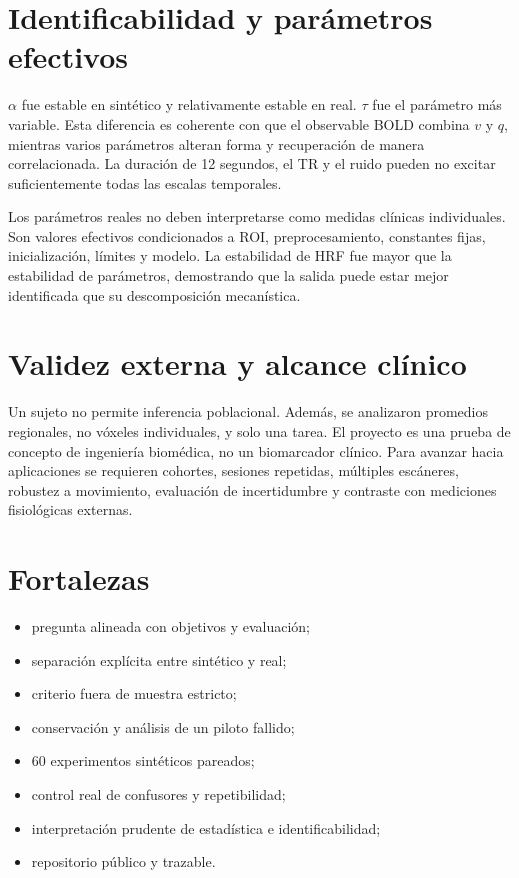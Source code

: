 \section{Identificabilidad y parámetros efectivos}
$\alpha$ fue estable en sintético y relativamente estable en real. $\tau$ fue el parámetro más variable. Esta diferencia es coherente con que el observable BOLD combina $v$ y $q$, mientras varios parámetros alteran forma y recuperación de manera correlacionada. La duración de 12 segundos, el TR y el ruido pueden no excitar suficientemente todas las escalas temporales.

Los parámetros reales no deben interpretarse como medidas clínicas individuales. Son valores efectivos condicionados a ROI, preprocesamiento, constantes fijas, inicialización, límites y modelo. La estabilidad de HRF fue mayor que la estabilidad de parámetros, demostrando que la salida puede estar mejor identificada que su descomposición mecanística.

\section{Validez externa y alcance clínico}
Un sujeto no permite inferencia poblacional. Además, se analizaron promedios regionales, no vóxeles individuales, y solo una tarea. El proyecto es una prueba de concepto de ingeniería biomédica, no un biomarcador clínico. Para avanzar hacia aplicaciones se requieren cohortes, sesiones repetidas, múltiples escáneres, robustez a movimiento, evaluación de incertidumbre y contraste con mediciones fisiológicas externas.

\section{Fortalezas}
\begin{itemize}
  \item pregunta alineada con objetivos y evaluación;
  \item separación explícita entre sintético y real;
  \item criterio fuera de muestra estricto;
  \item conservación y análisis de un piloto fallido;
  \item 60 experimentos sintéticos pareados;
  \item control real de confusores y repetibilidad;
  \item interpretación prudente de estadística e identificabilidad;
  \item repositorio público y trazable.
\end{itemize}

